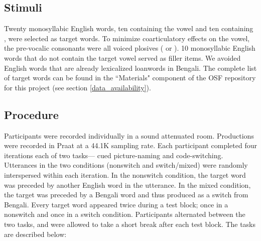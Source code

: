 \documentclass[12 pt]{article}
\newcommand{\nt}[1]{\textipa{[#1]}} %
\begin{document}
\subsection{Stimuli}
Twenty monosyllabic English words, ten containing the vowel \nt{2} and ten containing \nt{\ae}, were selected as target words. To minimize coarticulatory effects on the vowel, the pre-vocalic consonants were all voiced plosives (\nt{b} or \nt{d}). 10 monosyllabic English words that do not contain the target vowel served as filler items. We avoided English words that are already lexicalized loanwords in Bengali. The complete list of target words can be found in the ``Materials" component of the OSF repository for this project (see section \ref{data_availability}).



\subsection{Procedure} \label{procedure}
Participants were recorded individually in a sound attenuated room. Productions were recorded in Praat \citep{boersma2016praat} at a 44.1K sampling rate. Each participant completed four iterations each of two tasks--- cued picture-naming and code-switching. Utterances in the two conditions (nonswitch and switch/mixed) were randomly interspersed within each iteration. In the nonswitch condition, the target word was preceded by another English word in the utterance. In the mixed condition, the target was preceded by a Bengali word and thus produced as a switch from Bengali. Every target word appeared twice during a test block; once in a nonswitch and once in a switch condition. Participants alternated between the two tasks, and were allowed to take a short break after each test block. The tasks are described below:
\end{document}
